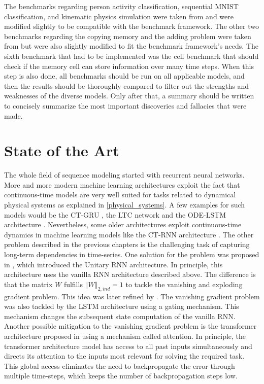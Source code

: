 \documentclass[draft,final]{vutinfth} %
\begin{document}
The benchmarks regarding person activity classification, sequential MNIST classification, and kinematic physics simulation were taken from \cite{ODELSTM} and were modified slightly to be compatible with the benchmark framework.
The other two benchmarks regarding the copying memory and the adding problem were taken from \cite{UnitaryRNNs} but were also slightly modified to fit the benchmark framework's needs.
The sixth benchmark that had to be implemented was the cell benchmark that should check if the memory cell can store information over many time steps.
When this step is also done, all benchmarks should be run on all applicable models, and then the results should be thoroughly compared to filter out the strengths and weaknesses of the diverse models.
Only after that, a summary should be written to concisely summarize the most important discoveries and fallacies that were made.


\section{State of the Art}
The whole field of sequence modeling started with recurrent neural networks.
More and more modern machine learning architectures exploit the fact that continuous-time models are very well suited for tasks related to dynamical physical systems as explained in \ref{physical_systems}.
A few examples for such models would be the CT-GRU \cite{CTGRU}, the LTC network \cite{LTCNetworks} and the ODE-LSTM architecture \cite{ODELSTM}.
Nevertheless, some older architectures exploit continuous-time dynamics in machine learning models like the CT-RNN architecture \cite{CTRNN}.
The other problem described in the previous chapters is the challenging task of capturing long-term dependencies in time-series.
One solution for the problem was proposed in \cite{UnitaryRNNs}, which introduced the Unitary RNN architecture.
In principle, this architecture uses the vanilla RNN architecture described above. The difference is that the matrix $W$ fulfills $\left\Vert W \right\Vert_{2,ind} = 1$ to tackle the vanishing and exploding gradient problem.
This idea was later refined by \cite{EfficientUnitaryRNNs}.
The vanishing gradient problem was also tackled by the LSTM architecture \cite{LSTM} using a gating mechanism.
This mechanism changes the subsequent state computation of the vanilla RNN.
Another possible mitigation to the vanishing gradient problem is the transformer architecture proposed in \cite{Transformer} using a mechanism called attention.
In principle, the transformer architecture model has access to all past inputs simultaneously and directs its attention to the inputs most relevant for solving the required task.
This global access eliminates the need to backpropagate the error through multiple time-steps, which keeps the number of backpropagation steps low.
\end{document}

